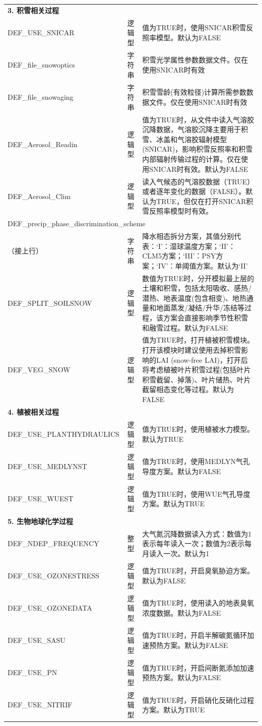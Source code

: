 \documentclass[a4paper,12pt,twoside]{article}
\begin{document}
{\begin{longtable}[!htbp]{lcp{}}
\textbf{3. 积雪相关过程} && \\
DEF\_USE\_SNICAR & 逻辑型 & 值为TRUE时，使用SNICAR积雪反照率模型。默认为FALSE \\
DEF\_file\_snowoptics & 字符串 & 积雪光学属性参数数据文件。仅在使用SNICAR时有效 \\
DEF\_file\_snowaging  & 字符串 & 积雪雪龄(有效粒径)计算所需参数数据文件。仅在使用SNICAR时有效 \\
DEF\_Aerosol\_Readin & 逻辑型 & 值为TRUE时，从文件中读入气溶胶沉降数据，气溶胶沉降主要用于积雪、冰盖和气溶胶辐射模型 (SNICAR)，影响积雪反照率和积雪内部辐射传输过程的计算。仅在使用SNICAR时有效。默认为FALSE \\
DEF\_Aerosol\_Clim & 逻辑型 & 读入气候态的气溶胶数据（TRUE）或者逐年变化的数据（FALSE）。默认为TRUE，但仅在打开SNICAR积雪反照率模型时有效。\\
\multicolumn{3}{l}{DEF\_precip\_phase\_discrimination\_scheme} \\
（接上行）& 字符串 & 降水相态拆分方案，其值分别代表：`I'：湿球温度方案；`II'：CLM5方案；`III'：PSY方案；`IV'：单阈值方案。默认为`II' \\
DEF\_SPLIT\_SOILSNOW & 逻辑型 & 数值为TRUE时，分开模拟最上层的土壤和积雪，包括太阳吸收、感热/潜热、地表温度(包含相变)、地热通量和地面蒸发/凝结/升华/冻结等过程，该方案会直接影响季节性积雪和融雪过程。默认为FALSE \\
DEF\_VEG\_SNOW & 逻辑型 & 值为TRUE时，打开植被积雪模块。打开该模块时建议使用去掉积雪影响的LAI (snow-free LAI)，打开后将考虑植被叶片积雪过程(包括叶片积雪截留、掉落)、叶片储热、叶片截留相态变化等过程。默认为FALSE \\
\midrule

\textbf{4. 植被相关过程} && \\
DEF\_USE\_PLANTHYDRAULICS & 逻辑型 & 值为TRUE时，使用植被水力模型。默认为TRUE \\
DEF\_USE\_MEDLYNST & 逻辑型 & 值为TRUE时，使用MEDLYN气孔导度方案。默认为FALSE \\
DEF\_USE\_WUEST & 逻辑型 & 值为TRUE时，使用WUE气孔导度方案。默认为TRUE \\ 
\midrule

\textbf{5. 生物地球化学过程} && \\
DEF\_NDEP\_FREQUENCY & 整型 & 大气氮沉降数据读入方式：数值为1表示每年读入一次；数值为2表示每月读入一次。默认为1 \\
DEF\_USE\_OZONESTRESS & 逻辑型 & 值为TRUE时，开启臭氧胁迫方案。默认为FALSE \\
DEF\_USE\_OZONEDATA & 逻辑型 & 值为TRUE时，使用读入的地表臭氧浓度数据。默认为FALSE \\
DEF\_USE\_SASU & 逻辑型 & 值为TRUE时，开启半解碳氮循环加速预热方案。默认为FALSE\\
DEF\_USE\_PN & 逻辑型 & 值为TRUE时，开启间断氮添加加速预热方案。默认为FALSE\\
DEF\_USE\_NITRIF & 逻辑型 & 值为TRUE时，开启硝化反硝化过程方案。默认为TRUE \\
\midrule


\end{longtable}}
\end{document}
